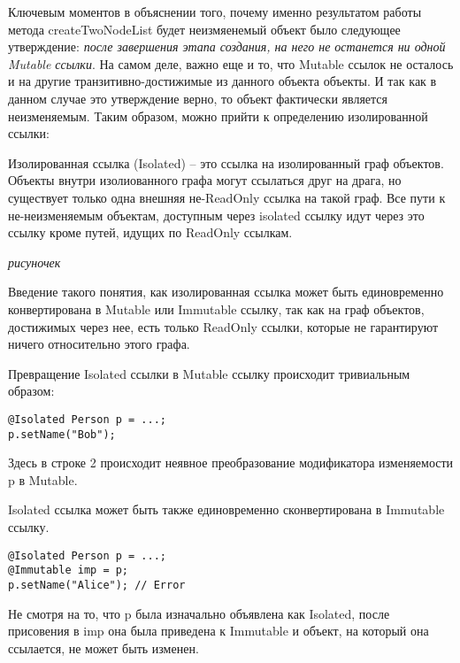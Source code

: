 Ключевым моментов в объяснении того, почему именно результатом работы метода createTwoNodeList будет неизмяенемый объект было следующее утверждение: \textit{после завершения этапа создания, на него не останется ни одной Mutable ссылки}. На самом деле, важно еще и то, что Mutable ссылок не осталось и на другие транзитивно-достижимые из данного объекта объекты. И так как в данном случае это утверждение верно, то объект фактически является неизменяемым. Таким образом, можно прийти к определению изолированной ссылки:

\begin{Def}\label{isolated_ref}
Изолированная ссылка (Isolated) -- это ссылка на изолированный граф объектов. Объекты внутри изолиованного графа могут ссылаться друг на драга, но существует только одна внешняя не-ReadOnly ссылка на такой граф. Все пути к не-неизменяемым объектам, доступным через isolated ссылку идут через это ссылку кроме путей, идущих по ReadOnly ссылкам.
\end{Def}

\textit{рисуночек} 

Введение такого понятия, как изолированная ссылка может быть единовременно конвертирована в Mutable или Immutable ссылку, так как на граф объектов, достижимых через нее, есть только ReadOnly ссылки, которые не гарантируют ничего относительно этого графа. 

Превращение Isolated ссылки в Mutable ссылку происходит тривиальным образом:

\begin{lstlisting}[caption=Превращение Isolated ссылки в Mutable, label=code:isolated_to_mutable]
@Isolated Person p = ...;
p.setName("Bob");
\end{lstlisting} 

Здесь в строке 2 происходит неявное преобразование модификатора изменяемости p в Mutable.

Isolated ссылка может быть также единовременно сконвертирована в Immutable ссылку.

\begin{lstlisting}[caption=Превращение Isolated ссылки в immutable, label=code:isolated_to_immutable]
@Isolated Person p = ...;
@Immutable imp = p;
p.setName("Alice"); // Error
\end{lstlisting} 

Не смотря на то, что p была изначально объявлена как Isolated, после присовения в imp она была приведена к Immutable и объект, на который она ссылается, не может быть изменен.

